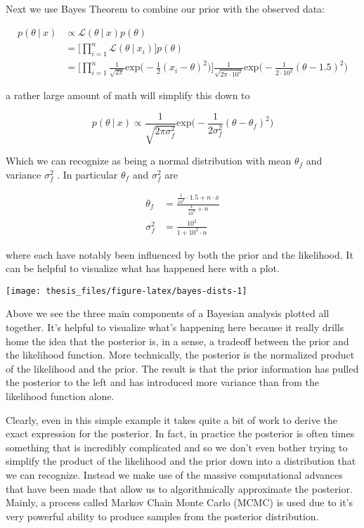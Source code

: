 \documentclass[12pt,twoside]{reedthesis}
\begin{document}
Next we use Bayes Theorem to combine our prior with the observed data:

\[
\begin{aligned}
p(\theta \ | \ x) &\propto \mathcal{L}(\theta \ | \ x)p(\theta) \\
&= \bigg[\prod_{i=1}^n\mathcal{L}(\theta \ | \ x_i)\bigg]p(\theta) \\
&= \bigg[\prod_{i=1}^n\frac{1}{\sqrt{2\pi}}\text{exp}\bigg(-\frac{1}{2}(x_i - \theta )^2\bigg)\bigg]\frac{1}{\sqrt{2\pi\cdot10^2}}\text{exp}\bigg(-\frac{1}{2\cdot10^2}(\theta - 1.5)^2\bigg) 
\end{aligned}
\]

a rather large amount of math will simplify this down to

\[
p(\theta \ | \ x) \propto \frac{1}{\sqrt{2\pi\sigma_f^2}}\text{exp}\bigg(-\frac{1}{2\sigma_f^2}(\theta - \theta_f)^2\bigg)
\]

Which we can recognize as being a normal distribution with mean \(\theta_f\) and variance \(\sigma^2_f\) . In particular \(\theta_f\) and \(\sigma^2_f\) are

\[
\begin{aligned}
\theta_f &= \frac{\frac{1}{10^2}\cdot1.5 + n\cdot \bar{x}}{\frac{1}{10^2} + n} \\
\sigma^2_f &= \frac{10^2}{1 + 10^2\cdot n}
\end{aligned}
\]

where each have notably been influenced by both the prior and the likelihood. It can be helpful to visualize what has happened here with a plot.
\begin{center}\texttt{[image: thesis\_files/figure-latex/bayes-dists-1]} \end{center}

Above we see the three main components of a Bayesian analysis plotted all together. It's helpful to visualize what's happening here because it really drills home the idea that the posterior is, in a sense, a tradeoff between the prior and the likelihood function. More technically, the posterior is the normalized product of the likelihood and the prior. The result is that the prior information has pulled the posterior to the left and has introduced more variance than from the likelihood function alone.

Clearly, even in this simple example it takes quite a bit of work to derive the exact expression for the posterior. In fact, in practice the posterior is often times something that is incredibly complicated and so we don't even bother trying to simplify the product of the likelihood and the prior down into a distribution that we can recognize. Instead we make use of the massive computational advances that have been made that allow us to algorithmically approximate the posterior. Mainly, a process called Markov Chain Monte Carlo (MCMC) is used due to it's very powerful ability to produce samples from the posterior distribution.
\end{document}
